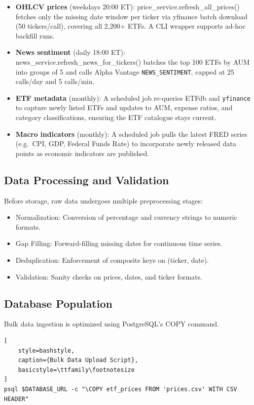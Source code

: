 \begin{itemize}
    \item \textbf{OHLCV prices} (weekdays 20:00 ET): price\_service.refresh\_all\_prices() fetches only the missing date window per ticker via yfinance batch download (50 tickers/call), covering all 2,200+ ETFs. A CLI wrapper supports ad-hoc backfill runs.
    \item \textbf{News sentiment} (daily 18:00 ET): news\_service.refresh\_news\_for\_tickers() batches the top 100 ETFs by AUM into groups of 5 and calls Alpha Vantage \texttt{NEWS\_SENTIMENT}, capped at 25 calls/day and 5 calls/min.
    \item \textbf{ETF metadata} (monthly): A scheduled job re-queries ETFdb and \texttt{yfinance} to capture newly listed ETFs and updates to AUM, expense ratios, and category classifications, ensuring the ETF catalogue stays current.
    \item \textbf{Macro indicators} (monthly): A scheduled job pulls the latest FRED series (e.g.\ CPI, GDP, Federal Funds Rate) to incorporate newly released data points as economic indicators are published.
\end{itemize}

\subsection{Data Processing and Validation}

Before storage, raw data undergoes multiple preprocessing stages:
\begin{itemize}
    \item {Normalization:} Conversion of percentage and currency strings to numeric formats.
    \item {Gap Filling:} Forward-filling missing dates for continuous time series.
    \item{Deduplication:} Enforcement of composite keys on (ticker, date).
    \item {Validation:} Sanity checks on prices, dates, and ticker formats.
\end{itemize}

\subsection{Database Population}

Bulk data ingestion is optimized using PostgreSQL’s COPY command.
\begin{lstlisting}[
    style=bashstyle,
    caption={Bulk Data Upload Script},
    basicstyle=\ttfamily\footnotesize
]
psql $DATABASE_URL -c "\COPY etf_prices FROM 'prices.csv' WITH CSV HEADER"
\end{lstlisting}


